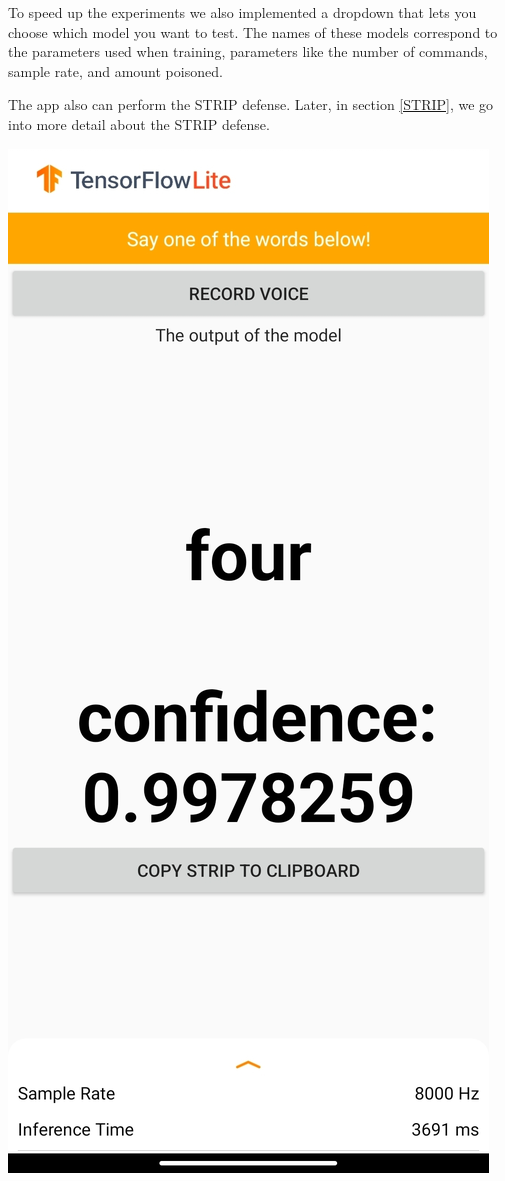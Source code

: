 \documentclass{report}
\theoremstyle{definition}
\theoremstyle{remark}
\begin{document}
To speed up the experiments we also implemented a dropdown that lets you choose which model you want to test. The names of these models correspond to the parameters used when training, parameters like the number of commands, sample rate, and amount poisoned.

The app also can perform the STRIP defense. Later, in section \ref{STRIP}, we go into more detail about the STRIP defense. 

\begin{minipage}{\textwidth}
\begin{minipage}{.5\textwidth}
    \centering
    \includegraphics[scale=0.1]{img/app.jpg}

\end{minipage}
\end{minipage}
\end{document}
